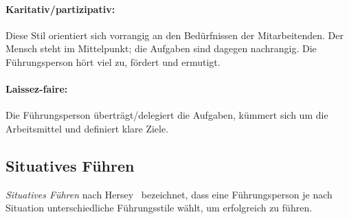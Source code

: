 \paragraph{Karitativ/partizipativ:} Diese Stil orientiert sich vorrangig an den Bedürfnissen der Mitarbeitenden. Der Mensch steht im Mittelpunkt; die Aufgaben sind dagegen nachrangig. Die Führungsperson hört viel zu, fördert und ermutigt.

\paragraph{Laissez-faire:} Die Führungsperson überträgt/delegiert die Aufgaben, kümmert sich um die Arbeitsmittel und definiert klare Ziele.


\subsection{Situatives Führen}

\emph{Situatives Führen} nach Hersey~\cite{hersey-management} bezeichnet, dass eine Führungsperson je nach Situation unterschiedliche Führungsstile wählt, um erfolgreich zu führen.
